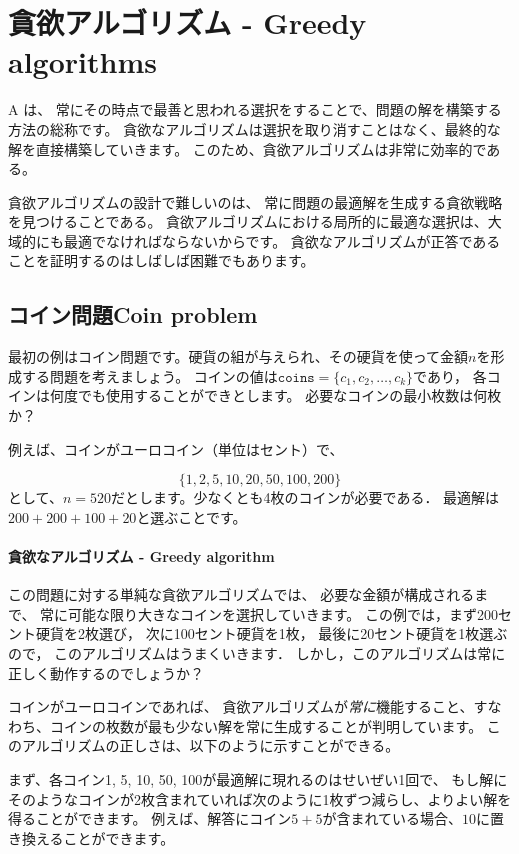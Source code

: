 \chapter{貪欲アルゴリズム - Greedy algorithms}


A は、
常にその時点で最善と思われる選択をすることで、問題の解を構築する方法の総称です。
貪欲なアルゴリズムは選択を取り消すことはなく、最終的な解を直接構築していきます。
このため、貪欲アルゴリズムは非常に効率的である。

貪欲アルゴリズムの設計で難しいのは、
常に問題の最適解を生成する貪欲戦略を見つけることである。
貪欲アルゴリズムにおける局所的に最適な選択は、大域的にも最適でなければならないからです。
貪欲なアルゴリズムが正答であることを証明するのはしばしば困難でもあります。

\section{コイン問題Coin problem}

最初の例はコイン問題です。硬貨の組が与えられ、その硬貨を使って金額$n$を形成する問題を考えましょう。
コインの値は$\texttt{coins}=\{c_1,c_2,\ldots,c_k\}$であり，
各コインは何度でも使用することができとします。
必要なコインの最小枚数は何枚か？

例えば、コインがユーロコイン（単位はセント）で、

\[\{1,2,5,10,20,50,100,200\}\]
として、$n=520$だとします。少なくとも4枚のコインが必要である．
最適解は$200+200+100+20$と選ぶことです。

\subsubsection{貪欲なアルゴリズム - Greedy algorithm}

この問題に対する単純な貪欲アルゴリズムでは、
必要な金額が構成されるまで、
常に可能な限り大きなコインを選択していきます。
この例では，まず200セント硬貨を2枚選び，
次に100セント硬貨を1枚，
最後に20セント硬貨を1枚選ぶので，
このアルゴリズムはうまくいきます．
しかし，このアルゴリズムは常に正しく動作するのでしょうか？

コインがユーロコインであれば、
貪欲アルゴリズムが\emph{常に}機能すること、すなわち、コインの枚数が最も少ない解を常に生成することが判明しています。
このアルゴリズムの正しさは、以下のように示すことができる。

まず、各コイン1, 5, 10, 50, 100が最適解に現れるのはせいぜい1回で、
もし解にそのようなコインが2枚含まれていれば次のように1枚ずつ減らし、よりよい解を得ることができます。
例えば、解答にコイン$5+5$が含まれている場合、$10$に置き換えることができます。

